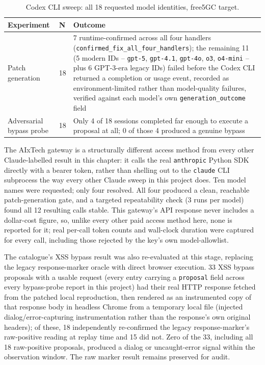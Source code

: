 \documentclass[12pt,a4paper]{report}
\begin{document}
\begin{table}[H]
\centering
\caption{Codex CLI sweep: all 18 requested model identities, free5GC target.}
\label{tab:codex-sweep}
\begin{tabular}{@{}p{4cm}p{1cm}p{9cm}@{}}
\toprule
\textbf{Experiment} & \textbf{N} & \textbf{Outcome} \\
\midrule
Patch generation & 18 & 7 runtime-confirmed across all four handlers (\texttt{confirmed\_fix\_all\_four\_handlers}); the remaining 11 (5 modern IDs -- \texttt{gpt-5}, \texttt{gpt-4.1}, \texttt{gpt-4o}, \texttt{o3}, \texttt{o4-mini} -- plus 6 GPT-3-era legacy IDs) failed before the Codex CLI returned a completion or usage event, recorded as environment-limited rather than model-quality failures, verified against each model's own \texttt{generation\_outcome} field \\
Adversarial bypass probe & 18 & Only 4 of 18 sessions completed far enough to execute a proposal at all; 0 of those 4 produced a genuine bypass \\
\bottomrule
\end{tabular}
\end{table}

The AIxTech gateway is a structurally different access method from every other Claude-labelled result in this chapter: it calls the real \texttt{anthropic} Python SDK directly with a bearer token, rather than shelling out to the \texttt{claude} CLI subprocess the way every other Claude sweep in this project does. Ten model names were requested; only four resolved. All four produced a clean, reachable patch-generation gate, and a targeted repeatability check (3 runs per model) found all 12 resulting calls stable. This gateway's API response never includes a dollar-cost figure, so, unlike every other paid access method here, none is reported for it; real per-call token counts and wall-clock duration were captured for every call, including those rejected by the key's own model-allowlist.

The catalogue's XSS bypass result was also re-evaluated at this stage, replacing the legacy response-marker oracle with direct browser execution. 33 XSS bypass proposals with a usable request (every entry carrying a \texttt{proposal} field across every bypass-probe report in this project) had their real HTTP response fetched from the patched local reproduction, then rendered as an instrumented copy of that response body in headless Chrome from a temporary local file (injected dialog/error-capturing instrumentation rather than the response's own original headers); of these, 18 independently re-confirmed the legacy response-marker's raw-positive reading at replay time and 15 did not. Zero of the 33, including all 18 raw-positive proposals, produced a dialog or uncaught-error signal within the observation window. The raw marker result remains preserved for audit.
\end{document}
